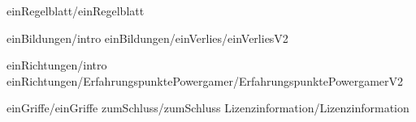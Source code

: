 
 {einRegelblatt/einRegelblatt}

 {einBildungen/intro}
 {einBildungen/einVerlies/einVerliesV2}

 {einRichtungen/intro}
 {einRichtungen/ErfahrungspunktePowergamer/ErfahrungspunktePowergamerV2}

 {einGriffe/einGriffe}
 {zumSchluss/zumSchluss}
 {Lizenzinformation/Lizenzinformation}

